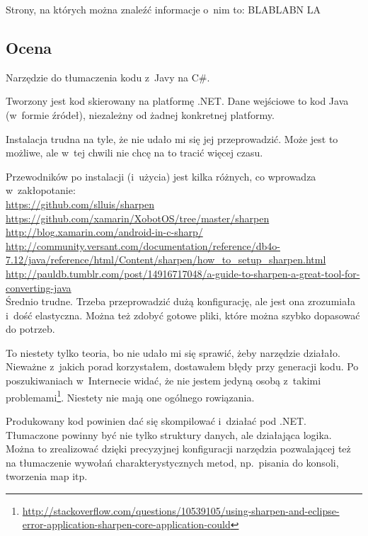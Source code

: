 Strony, na których można znaleźć informacje o~nim to: BLABLABN LA

\subsection{Ocena}

\begin{description}
Narzędzie do tłumaczenia kodu z~Javy na C\#.

Tworzony jest kod skierowany na platformę .NET\@. Dane wejściowe to kod Java (w~formie źródeł), niezależny od żadnej konkretnej platformy.

Instalacja trudna na tyle, że nie udało mi się jej przeprowadzić. Może jest to możliwe, ale w~tej chwili nie chcę na to tracić więcej czasu.

Przewodników po instalacji (i~użycia) jest kilka różnych, co wprowadza w~zakłopotanie: \\
\url{https://github.com/slluis/sharpen}\\
\url{https://github.com/xamarin/XobotOS/tree/master/sharpen}\\
\url{http://blog.xamarin.com/android-in-c-sharp/}\\
\url{http://community.versant.com/documentation/reference/db4o-7.12/java/reference/html/Content/sharpen/how_to_setup_sharpen.html}\\
\url{http://pauldb.tumblr.com/post/14916717048/a-guide-to-sharpen-a-great-tool-for-converting-java}\\

Średnio trudne.
Trzeba przeprowadzić dużą konfigurację, ale jest ona zrozumiała i~dość elastyczna. Można też zdobyć gotowe pliki, które można  szybko dopasować do potrzeb.

To niestety tylko teoria, bo nie udało mi się sprawić, żeby narzędzie działało.
Nieważne z~jakich porad korzystałem, dostawałem błędy przy generacji kodu.
Po poszukiwaniach w~Internecie widać, że nie jestem jedyną osobą z~takimi problemami\footnote{\url{http://stackoverflow.com/questions/10539105/using-sharpen-and-eclipse-error-application-sharpen-core-application-could}}.
Niestety nie mają one ogólnego rowiązania.

Produkowany kod powinien dać się skompilować i~działać pod .NET\@.
Tłumaczone powinny być nie tylko struktury danych, ale działająca logika. Można to zrealizować dzięki precyzyjnej konfiguracji narzędzia pozwalającej też na tłumaczenie wywołań charakterystycznych metod, np.\ pisania do konsoli, tworzenia map itp.


\end{description}

